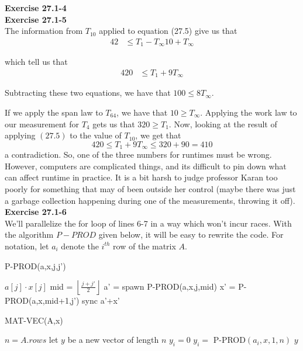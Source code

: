 \documentclass{article}
\begin{document}
\noindent\textbf{Exercise 27.1-4}\\


\noindent\textbf{Exercise 27.1-5}\\

The information from $T_{10}$ applied to equation (27.5) give us that
\begin{align*}
42 &\le {T_1 - T_\infty}{10} + T_\infty
\end{align*}

which tell us that 
\begin{align*}
420 &\le T_1 +9 T_\infty
\end{align*}


Subtracting these two equations, we have that $100 \le 8 T_\infty$.

If we apply the span law to $T_64$, we have that $10\ge T_\infty$. Applying the work law to our measurement for $T_4$ gets us that $320 \ge  T_1$. Now, looking at the result of applying $(27.5)$ to the value of $T_10$, we get that
\[
420 \le T_1 + 9T_\infty \le 320 + 90 = 410
\]
a contradiction. So, one of the three numbers for runtimes must be wrong. However, computers are complicated things, and its difficult to pin down what can affect runtime in practice. It is a bit harsh to judge professor Karan too poorly for something that may of been outside her control (maybe there was just a garbage collection happening during one of the measurements, throwing it off).\\

\noindent\textbf{Exercise 27.1-6}\\

We'll parallelize the for loop of lines 6-7 in a way which won't incur races.  With the algorithm $P-PROD$ given below, it will be easy to rewrite the code.  For notation, let $a_i$ denote the $i^{th}$ row of the matrix $A$.

\begin{algorithm}
\caption{P-PROD(a,x,j,j')}
\begin{algorithmic}[1]
\State \Return  $a[j] \cdot x[j]$
\EndIf
\State mid = $\left\lfloor \frac{j+j'}{2}\right\rfloor$
\State a' = spawn P-PROD(a,x,j,mid)
\State x' = P-PROD(a,x,mid+1,j')
\State sync
\State \Return a'+x'
\end{algorithmic}
\end{algorithm}

\begin{algorithm}
\caption{MAT-VEC(A,x)}
\begin{algorithmic}[1]
\State $n=A.rows$
\State let $y$ be a new vector of length $n$
	\State $y_i = 0$
\EndParFor
{}
	\State $y_i = $ P-PROD$(a_i, x, 1, n)$
\EndParFor
\State \Return $y$
\end{algorithmic}
\end{algorithm}
\end{document}
